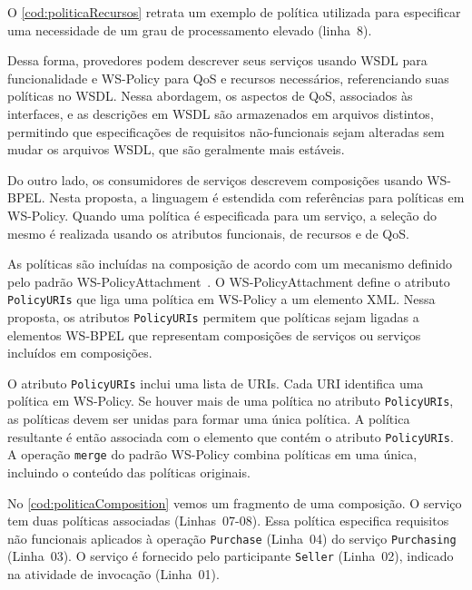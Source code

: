 \documentclass[12pt]{report} %
\begin{document}
	O \autoref{cod:politicaRecursos} retrata um exemplo de política utilizada para especificar uma necessidade de um grau de processamento elevado (linha~8).

 	    

	Dessa forma, provedores podem descrever seus serviços usando WSDL para funcionalidade e WS-Policy para QoS e recursos necessários, referenciando suas políticas no WSDL.
	Nessa abordagem, os aspectos de QoS, associados às interfaces, e as descrições em WSDL são armazenados em arquivos distintos, permitindo que especificações de requisitos não-funcionais sejam alteradas sem mudar os arquivos WSDL, que são geralmente mais estáveis.
	
	Do outro lado, os consumidores de serviços descrevem composições usando WS-BPEL.
	Nesta proposta, a linguagem é estendida com referências para políticas em WS-Policy.
	Quando uma política é especificada para um serviço, a seleção do mesmo é realizada usando os atributos funcionais, de recursos e de QoS.    
	    
	As políticas são incluídas na composição de acordo com um mecanismo definido pelo padrão WS-PolicyAttachment~\cite{wspolicyattachment:website}.
	O WS-PolicyAttachment define o atributo \texttt{PolicyURIs} que liga uma política em WS-Policy a um elemento XML.
	Nessa proposta, os atributos \texttt{PolicyURIs} permitem que políticas sejam ligadas a elementos WS-BPEL que representam composições de serviços ou serviços incluídos em composições.
	
	O atributo \texttt{PolicyURIs} inclui uma lista de URIs.
	Cada URI identifica uma política em WS-Policy.
	Se houver mais de uma política no atributo \texttt{PolicyURIs}, as políticas devem ser unidas para formar uma única política.
	A política resultante é então associada com o elemento que contém o atributo \texttt{PolicyURIs}.
	A operação \texttt{merge} do padrão WS-Policy combina políticas em uma única, incluindo o conteúdo das políticas originais.
	
	No \autoref{cod:politicaComposition} vemos um fragmento de uma composição.
	O serviço tem duas políticas associadas (Linhas~07-08).
	Essa política especifica requisitos não funcionais aplicados à operação \texttt{Purchase} (Linha~04) do serviço \texttt{Purchasing} (Linha~03).
	O serviço é fornecido pelo participante \texttt{Seller} (Linha~02), indicado na atividade de invocação (Linha~01).
\end{document}
